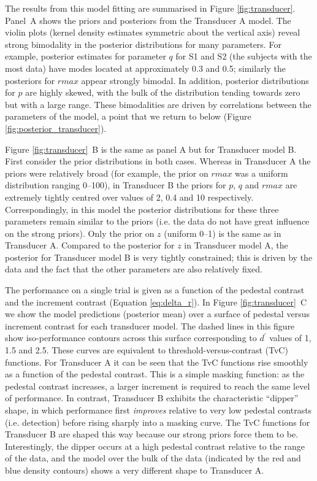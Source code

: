\documentclass[11pt,a4paper]{article}
\begin{document}
The results from this model fitting are summarised in Figure \ref{fig:transducer}.
Panel~A shows the priors and posteriors from the Transducer A model.
The violin plots (kernel density estimates symmetric about the vertical axis) reveal strong bimodality in the posterior distributions for many parameters.
For example, posterior estimates for parameter $q$ for S1 and S2 (the subjects with the most data) have modes located at approximately 0.3 and 0.5; similarly the posteriors for $rmax$ appear strongly bimodal.
In addition, posterior distributions for $p$ are highly skewed, with the bulk of the distribution tending towards zero but with a large range.
These bimodalities are driven by correlations between the parameters of the model, a point that we return to below (Figure \ref{fig:posterior_transducer}).

Figure \ref{fig:transducer}~B is the same as panel A but for Transducer model B.
First consider the prior distributions in both cases.
Whereas in Transducer A the priors were relatively broad (for example, the prior on $rmax$ was a uniform distribution ranging 0--100), in Transducer B the priors for $p$, $q$ and $rmax$ are extremely tightly centred over values of 2, 0.4 and 10 respectively.
Correspondingly, in this model the posterior distributions for these three parameters remain similar to the priors (i.e. the data do not have great influence on the strong priors).
Only the prior on $z$ (uniform 0--1) is the same as in Transducer A.
Compared to the posterior for $z$ in Transducer model A, the posterior for Transducer model B is very tightly constrained; this is driven by the data and the fact that the other parameters are also relatively fixed.

The performance on a single trial is given as a function of the pedestal contrast and the increment contrast (Equation \ref{eq:delta_r}).
In Figure \ref{fig:transducer}~C we show the model predictions (posterior mean) over a surface of pedestal versus increment contrast for each transducer model.
The dashed lines in this figure show iso-performance contours across this surface corresponding to $d^\prime$ values of 1, 1.5 and 2.5.
These curves are equivalent to threshold-versus-contrast (TvC) functions.
For Transducer A it can be seen that the TvC functions rise smoothly as a function of the pedestal contrast.
This is a simple masking function: as the pedestal contrast increases, a larger increment is required to reach the same level of performance.
In contrast, Transducer B exhibits the characteristic ``dipper'' shape, in which performance first \textit{improves} relative to very low pedestal contrasts (i.e. detection) before rising sharply into a masking curve.
The TvC functions for Transducer B are shaped this way because our strong priors force them to be.
Interestingly, the dipper occurs at a high pedestal contrast relative to the range of the data, and the model over the bulk of the data (indicated by the red and blue density contours) shows a very different shape to Transducer A.
\end{document}
